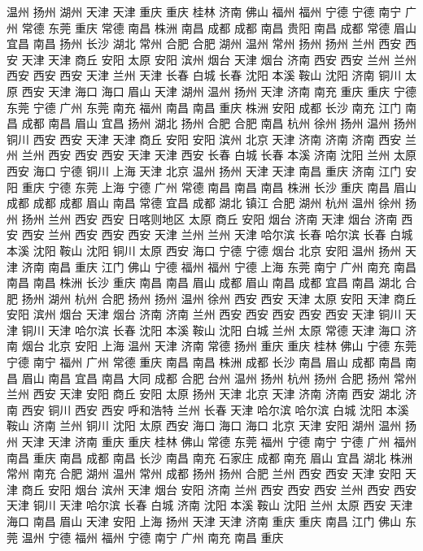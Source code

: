温州
扬州
湖州
天津
天津
重庆
重庆
桂林
济南
佛山
福州
福州
宁德
宁德
南宁
广州
常德
东莞
重庆
常德
南昌
株洲
南昌
成都
成都
南昌
贵阳
南昌
成都
常德
眉山
宜昌
南昌
扬州
长沙
湖北
常州
合肥
合肥
湖州
温州
常州
扬州
扬州
兰州
西安
西安
天津
天津
商丘
安阳
太原
安阳
滨州
烟台
天津
烟台
济南
西安
西安
兰州
兰州
西安
西安
西安
天津
兰州
天津
长春
白城
长春
沈阳
本溪
鞍山
沈阳
济南
铜川
太原
西安
天津
海口
海口
眉山
天津
湖州
温州
扬州
天津
济南
南充
重庆
重庆
宁德
东莞
宁德
广州
东莞
南充
福州
南昌
南昌
重庆
株洲
安阳
成都
长沙
南充
江门
南昌
成都
南昌
眉山
宜昌
扬州
湖北
扬州
合肥
合肥
南昌
杭州
徐州
扬州
温州
扬州
铜川
西安
西安
天津
天津
商丘
安阳
安阳
滨州
北京
天津
济南
济南
济南
西安
兰州
兰州
西安
西安
西安
天津
天津
西安
长春
白城
长春
本溪
济南
沈阳
兰州
太原
西安
海口
宁德
铜川
上海
天津
北京
温州
扬州
天津
天津
南昌
重庆
济南
江门
安阳
重庆
宁德
东莞
上海
宁德
广州
常德
南昌
南昌
南昌
株洲
长沙
重庆
南昌
眉山
成都
成都
成都
眉山
南昌
常德
宜昌
成都
湖北
镇江
合肥
湖州
杭州
温州
徐州
扬州
扬州
兰州
西安
西安
日喀则地区
太原
商丘
安阳
烟台
济南
天津
烟台
济南
西安
西安
兰州
西安
西安
西安
天津
兰州
兰州
天津
哈尔滨
长春
哈尔滨
长春
白城
本溪
沈阳
鞍山
沈阳
铜川
太原
西安
海口
宁德
宁德
烟台
北京
安阳
温州
扬州
天津
济南
南昌
重庆
江门
佛山
宁德
福州
福州
宁德
上海
东莞
南宁
广州
南充
南昌
南昌
南昌
株洲
长沙
重庆
南昌
南昌
眉山
成都
眉山
南昌
成都
宜昌
南昌
湖北
合肥
扬州
湖州
杭州
合肥
扬州
扬州
温州
徐州
西安
西安
天津
太原
安阳
天津
商丘
安阳
滨州
烟台
天津
烟台
济南
济南
兰州
西安
西安
西安
西安
西安
天津
铜川
天津
铜川
天津
哈尔滨
长春
沈阳
本溪
鞍山
沈阳
白城
兰州
太原
常德
天津
海口
济南
烟台
北京
安阳
上海
温州
天津
济南
常德
扬州
重庆
重庆
桂林
佛山
宁德
东莞
宁德
南宁
福州
广州
常德
重庆
南昌
南昌
株洲
成都
长沙
南昌
眉山
成都
南昌
南昌
眉山
南昌
宜昌
南昌
大同
成都
合肥
台州
温州
扬州
杭州
扬州
合肥
扬州
常州
兰州
西安
天津
安阳
商丘
安阳
太原
扬州
天津
北京
天津
济南
济南
西安
湖北
济南
西安
铜川
西安
西安
呼和浩特
兰州
长春
天津
哈尔滨
哈尔滨
白城
沈阳
本溪
鞍山
济南
兰州
铜川
沈阳
太原
西安
海口
海口
海口
北京
天津
安阳
湖州
温州
扬州
天津
天津
济南
重庆
重庆
桂林
佛山
常德
东莞
福州
宁德
南宁
宁德
广州
福州
南昌
重庆
南昌
成都
南昌
长沙
南昌
南充
石家庄
成都
南充
眉山
宜昌
湖北
株洲
常州
南充
合肥
湖州
温州
常州
成都
扬州
扬州
合肥
兰州
西安
西安
天津
安阳
天津
商丘
安阳
烟台
滨州
天津
烟台
安阳
济南
兰州
西安
西安
西安
兰州
西安
西安
天津
铜川
天津
哈尔滨
长春
白城
济南
沈阳
本溪
鞍山
沈阳
兰州
太原
西安
天津
海口
南昌
眉山
天津
安阳
上海
扬州
天津
天津
济南
重庆
重庆
南昌
江门
佛山
东莞
温州
宁德
福州
福州
宁德
南宁
广州
南充
南昌
重庆
